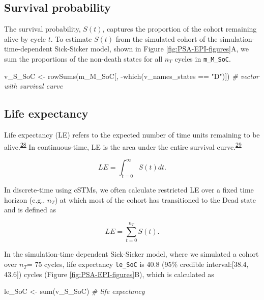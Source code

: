 \documentclass[
]{article}
\newenvironment{Shaded}{\begin{snugshade}}{\end{snugshade}}
\newcommand{\CommentTok}[1]{\textcolor[rgb]{0.56,0.35,0.01}{\textit{#1}}}
\newcommand{\FunctionTok}[1]{\textcolor[rgb]{0.00,0.00,0.00}{#1}}
\newcommand{\NormalTok}[1]{#1}
\newcommand{\OtherTok}[1]{\textcolor[rgb]{0.56,0.35,0.01}{#1}}
\newcommand{\SpecialCharTok}[1]{\textcolor[rgb]{0.00,0.00,0.00}{#1}}
\newcommand{\StringTok}[1]{\textcolor[rgb]{0.31,0.60,0.02}{#1}}
\begin{document}
\hypertarget{survival-probability}{%
\subsection{Survival probability}\label{survival-probability}}

The survival probability, \(S(t)\), captures the proportion of the cohort remaining alive by cycle \(t\). To estimate \(S(t)\) from the simulated cohort of the simulation-time-dependent Sick-Sicker model, shown in Figure \ref{fig:PSA-EPI-figures}A, we sum the proportions of the non-death states for all \(n_T\) cycles in \texttt{m\_M\_SoC}.

\begin{Shaded}
\begin{Highlighting}[]
\NormalTok{v\_S\_SoC }\OtherTok{\textless{}{-}} \FunctionTok{rowSums}\NormalTok{(m\_M\_SoC[, }\SpecialCharTok{{-}}\FunctionTok{which}\NormalTok{(v\_names\_states }\SpecialCharTok{==} \StringTok{"D"}\NormalTok{)]) }\CommentTok{\# vector with survival curve}
\end{Highlighting}
\end{Shaded}

\hypertarget{life-expectancy}{%
\subsection{Life expectancy}\label{life-expectancy}}

Life expectancy (LE) refers to the expected number of time units remaining to be alive.\textsuperscript{\protect\hyperlink{ref-Lee2003a}{28}} In continuous-time, LE is the area under the entire survival curve.\textsuperscript{\protect\hyperlink{ref-Klein2003}{29}}

\[
LE = \int_{t=0}^{\infty}{S(t) dt}.
\]

In discrete-time using cSTMs, we often calculate restricted LE over a fixed time horizon (e.g., \(n_T\)) at which most of the cohort has transitioned to the Dead state and is defined as

\[
  LE = \sum_{t=0}^{n_T}{S(t)}.
\]

In the simulation-time dependent Sick-Sicker model, where we simulated a cohort over \(n_T\)= 75 cycles, life expectancy \texttt{le\_SoC} is 40.8 (95\% credible interval:{[}38.4, 43.6{]}) cycles (Figure \ref{fig:PSA-EPI-figures}B), which is calculated as

\begin{Shaded}
\begin{Highlighting}[]
\NormalTok{le\_SoC }\OtherTok{\textless{}{-}} \FunctionTok{sum}\NormalTok{(v\_S\_SoC) }\CommentTok{\# life expectancy}
\end{Highlighting}
\end{Shaded}
\end{document}
